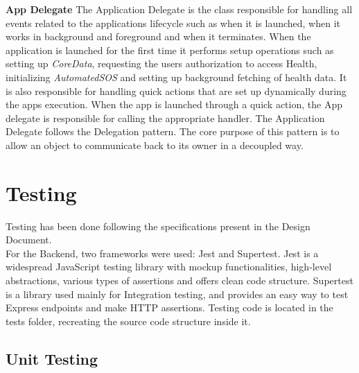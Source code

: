 \documentclass[titlepage]{article}
\begin{document}
	\newline
	\noindent
	{\bf App Delegate} \newline
	The Application Delegate is the class responsible for handling all events related to the application\textsc{}s lifecycle such as when it is launched, when it works in background and foreground and when it terminates.
	When the application is launched for the first time it performs setup operations such as setting up {\it CoreData}, requesting the user\textsc{}s authorization to access Health, initializing {\it AutomatedSOS} and setting up background fetching of health data. It is also responsible for handling quick actions that are set up dynamically during the app\textsc{}s execution. When the app is launched through a quick action, the App delegate is responsible for calling the appropriate handler.
	The Application Delegate follows the Delegation pattern. The core purpose of this pattern is to allow an object to communicate back to its owner in a decoupled way. 
	\newline
	\newline
	\noindent
	
	
	
	\pagebreak
	\section{Testing}
	Testing has been done following the specifications present in the Design Document. \\
	\linebreak
	For the Backend, two frameworks were used: Jest and Supertest. 
	Jest is a widespread JavaScript testing library with mockup functionalities, high-level abstractions, various types of assertions and offers clean code structure.
	Supertest is a library used mainly for Integration testing, and provides an easy way to test Express endpoints and make HTTP assertions.
	Testing code is located in the tests folder, recreating the source code structure inside it.
	
	\subsection{Unit Testing}
\end{document}
